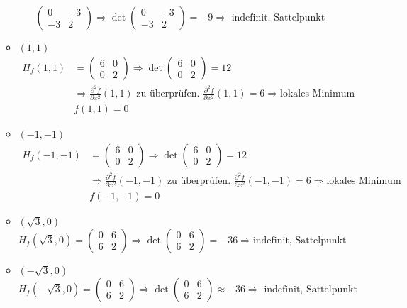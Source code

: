 \documentclass[10pt,a4paper,parskip=half]{scrartcl}
\begin{document}
\begin{enumerate}[(i)]
\begin{itemize}
\[			\begin{pmatrix}
				0 & -3 \\
				-3 & 2		
			\end{pmatrix} \Rightarrow 
			\det \begin{pmatrix}
				0 & -3 \\
				-3 & 2		
			\end{pmatrix} = -9 \Rightarrow \text{ indefinit, Sattelpunkt}\]
		\item 	$(1,1)$
			\begin{align*}H_f(1,1) &= 
			\begin{pmatrix}
				6 & 0 \\
				0 & 2		
			\end{pmatrix} \Rightarrow 
			\det \begin{pmatrix}
				6 & 0 \\
				0 & 2		
			\end{pmatrix} = 12 \\
			&\Rightarrow \frac{\partial^2 f}{\partial x^2}(1,1) \text{ zu überprüfen. } \frac{\partial^2 f}{\partial x^2}(1,1) = 6 \Rightarrow \text{lokales Minimum}\\
			&f(1,1) = 0 \end{align*}
		\item  	$(-1,-1)$
			\begin{align*}H_f(-1,-1) &= 
			\begin{pmatrix}
				6 & 0 \\
				0 & 2		
			\end{pmatrix} \Rightarrow 
			\det \begin{pmatrix}
				6 & 0 \\
				0 & 2		
			\end{pmatrix} = 12 \\
			&\Rightarrow \frac{\partial^2 f}{\partial x^2}(-1,-1) \text{ zu überprüfen. } \frac{\partial^2 f}{\partial x^2}(-1,-1) = 6 \Rightarrow \text{lokales Minimum} \\
			&f(-1,-1) = 0 \end{align*}
		\item 	$(\sqrt{3},0)$
			\[H_f(\sqrt{3},0) = 
			\begin{pmatrix}
				0 & 6 \\
				6 & 2		
			\end{pmatrix} \Rightarrow 
			\det \begin{pmatrix}
				0 & 6 \\
				6 & 2	
			\end{pmatrix} = -36 \Rightarrow \text{indefinit, Sattelpunkt}\]
		\item  	$(-\sqrt{3},0)$
			\[H_f(-\sqrt{3},0) = 
			\begin{pmatrix}
				0 & 6 \\
				6 & 2		
			\end{pmatrix} \Rightarrow 
			\det \begin{pmatrix}
				0 & 6 \\
				6 & 2	
			\end{pmatrix} \approx -36 \Rightarrow \text{ indefinit, Sattelpunkt}\]
	\end{itemize}
	

\end{enumerate}
\end{document}
